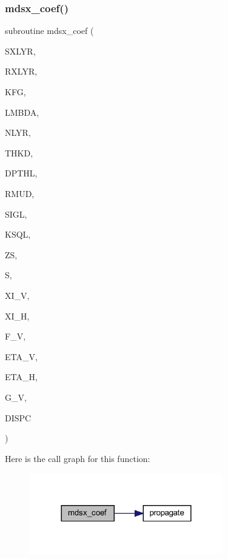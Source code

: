 \subsubsection{\texorpdfstring{mdsx\+\_\+coef()}{mdsx\_coef()}}
{\footnotesize\ttfamily subroutine mdsx\+\_\+coef (\begin{DoxyParamCaption}\item[{integer}]{S\+X\+L\+YR,  }\item[{integer}]{R\+X\+L\+YR,  }\item[{integer}]{K\+FG,  }\item[{real(kind=ql)}]{L\+M\+B\+DA,  }\item[{integer}]{N\+L\+YR,  }\item[{real(kind=ql), dimension (nlyr)}]{T\+H\+KD,  }\item[{real(kind=ql), dimension (nlyr)}]{D\+P\+T\+HL,  }\item[{real(kind=ql), dimension(0\+:nlyr)}]{R\+M\+UD,  }\item[{complex(kind=ql), dimension (nlyr)}]{S\+I\+GL,  }\item[{complex(kind=ql), dimension (nlyr)}]{K\+S\+QL,  }\item[{real(kind=ql)}]{ZS,  }\item[{complex(kind=ql), dimension (0\+:nlyr)}]{S,  }\item[{complex(kind=ql)}]{X\+I\+\_\+V,  }\item[{complex(kind=ql)}]{X\+I\+\_\+H,  }\item[{complex(kind=ql)}]{F\+\_\+V,  }\item[{complex(kind=ql)}]{E\+T\+A\+\_\+V,  }\item[{complex(kind=ql)}]{E\+T\+A\+\_\+H,  }\item[{complex(kind=ql)}]{G\+\_\+V,  }\item[{complex(kind=ql)}]{D\+I\+S\+PC }\end{DoxyParamCaption})}

Here is the call graph for this function\+:\nopagebreak
\begin{figure}[H]
\begin{center}
\leavevmode
\includegraphics[width=240pt]{Leroi__c_8f90_a004c7d5d0aeff550ae33684b04654b48_cgraph}
\end{center}
\end{figure}
\mbox{\label{Leroi__c_8f90_a4bfc3438dc7d8469c5ec8f1888d7fc50}} 

